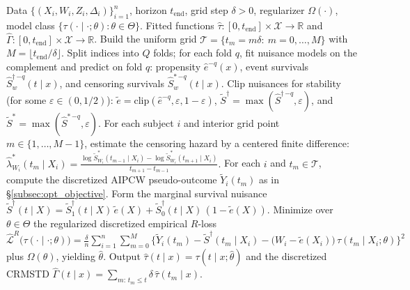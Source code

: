 \documentclass{article}
\newcommand{\tend}{t_{\mathrm{end}}}
\begin{document}
\begin{algorithm}[h!]
\caption{Cross-fitted AIR estimator for the tv-CATE and CRMSTD}\label{algo:estimation}
\begin{algorithmic}[1]
\Require Data $\{(X_i,W_i,Z_i,\Delta_i)\}_{i=1}^n$, horizon $\tend$, grid step $\delta>0$, regularizer $\Omega(\cdot)$, model class $\{\tau(\cdot\mid\cdot;\theta):\theta\in\Theta\}$.
\Ensure Fitted functions $\hat{\tau}:[0,\tend]\!\times\!\mathcal{X}\to\mathbb{R}$ and $\hat{\Gamma}:[0,\tend]\!\times\!\mathcal{X}\to\mathbb{R}$.
\State Build the uniform grid $\mathcal{T}=\{t_m=m\delta:\ m=0,\ldots,M\}$ with $M=\lfloor\tend/\delta\rfloor$.
\State Split indices into $Q$ folds; for each fold $q$, fit nuisance models on the complement and predict on fold $q$:
\Statex \hspace{\algorithmicindent} propensity $\hat e^{-q}(x)$, event survivals $\widehat S_{w}^{\dag\,{-q}}(t\mid x)$, and censoring survivals $\widehat S_{w}^{*\,{-q}}(t\mid x)$.
\State Clip nuisances for stability (for some $\varepsilon\in(0,1/2)$): $\tilde e=\mathrm{clip}(\hat e^{-q},\varepsilon,1-\varepsilon)$, $\widetilde S^{\dag}=\max(\widehat S^{\dag\,{-q}},\varepsilon)$, and $\widetilde S^{*}=\max(\widehat S^{*\,{-q}},\varepsilon)$.
\State For each subject $i$ and interior grid point $m\in\{1,\ldots,M-1\}$, estimate the censoring hazard by a centered finite difference:
\Statex \hspace{\algorithmicindent} $\displaystyle \widehat\lambda^{*}_{W_i}(t_m\mid X_i)=\frac{\log \widetilde S^{*}_{W_i}(t_{m-1}\mid X_i)-\log \widetilde S^{*}_{W_i}(t_{m+1}\mid X_i)}{t_{m+1}-t_{m-1}}.$
\State For each $i$ and $t_m\in\mathcal T$, compute the discretized AIPCW pseudo-outcome $\widetilde{Y}_i(t_m)$ as in \S\ref{subsec:opt_objective}.
\State Form the marginal survival nuisance $\widetilde{S}^{\dag}(t\mid X)=\widetilde S_1^{\dag}(t\mid X)\,\tilde e(X)+\widetilde S_0^{\dag}(t\mid X)\,(1-\tilde e(X))$.
\State Minimize over $\theta\in\Theta$ the regularized discretized empirical $R$-loss
\Statex \hspace{\algorithmicindent} $\displaystyle \widehat{\mathcal{L}}^{R}\!\big(\tau(\cdot\mid\cdot;\theta)\big)=\frac{\delta}{n}\sum_{i=1}^{n}\sum_{m=0}^{M}\Big\{\widetilde{Y}_i(t_m)-\widetilde{S}^{\dag}(t_m\mid X_i)-\big(W_i-\tilde e(X_i)\big)\,\tau(t_m\mid X_i;\theta)\Big\}^{2}$
\Statex \hspace{\algorithmicindent} plus $\Omega(\theta)$, yielding $\hat\theta$.
\State Output $\hat\tau(t\mid x)=\tau(t\mid x;\hat\theta)$ and the discretized CRMSTD
\Statex \hspace{\algorithmicindent} $\displaystyle \hat\Gamma(t\mid x)=\sum_{m:\,t_m\le t}\delta\,\hat\tau(t_m\mid x)$.
\end{algorithmic}
\end{algorithm}
\end{document}
